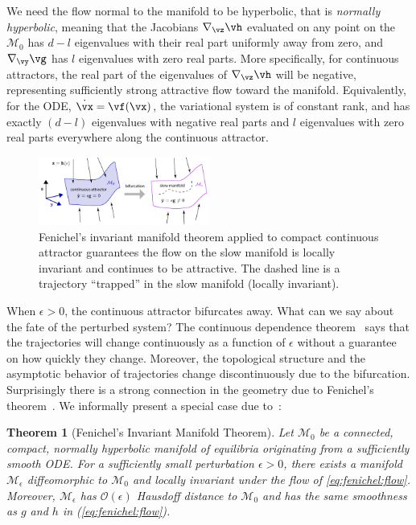 \documentclass{article} %
\newcounter{ct}
\newcommand{\manifold}{\mathcal{M}}
\newtheorem{theorem}{Theorem}
\theoremstyle{definition}
\theoremstyle{remark}
\renewcommand{\cite}{\citep}
\begin{document}
We need the flow normal to the manifold to be hyperbolic, that is \emph{normally hyperbolic}, meaning that the Jacobians $\nabla_\vz \vh$ evaluated on any point on the $\manifold_0$ has $d-l$ eigenvalues with their real part uniformly away from zero, and $\nabla_\vy \vg$ has $l$ eigenvalues with zero real parts.
More specifically, for continuous attractors, the real part of the eigenvalues of $\nabla_\vz \vh$ will be negative, representing sufficiently strong attractive flow toward the manifold.
Equivalently, for the ODE, $\dot{\vx} = \vf(\vx)$, the variational system is of constant rank, and has exactly $(d-l)$ eigenvalues with negative real parts and $l$ eigenvalues with zero real parts everywhere along the continuous attractor.

\begin{figure}[bthp]
  \centering
  \includegraphics[width=0.5\textwidth]{FenichelThm.pdf}
  \caption{
    Fenichel's invariant manifold theorem applied to compact continuous attractor guarantees the flow on the slow manifold is locally invariant and continues to be attractive.
    The dashed line is a trajectory ``trapped'' in the slow manifold (locally invariant).
  }
  \label{fig:fenichel}
\end{figure}

When $\epsilon > 0$, the continuous attractor bifurcates away.
What can we say about the fate of the perturbed system?
The continuous dependence theorem~\citep{Chicone2006} says that the trajectories will change continuously as a function of $\epsilon$ without a guarantee on how quickly they change.
Moreover, the topological structure and the asymptotic behavior of trajectories change discontinuously due to the bifurcation.
Surprisingly there is a strong connection in the geometry due to Fenichel's theorem~\cite{fenichel1971}.
We informally present a special case due to~\cite{Jones1995}:
\begin{theorem}[Fenichel's Invariant Manifold Theorem]
Let $\manifold_0$ be a connected, compact, normally hyperbolic manifold of equilibria originating from a sufficiently smooth ODE.
For a sufficiently small perturbation $\epsilon > 0$, there exists a manifold $\manifold_\epsilon$ diffeomorphic to $\manifold_0$ and locally invariant under the flow of \eqref{eq:fenichel:flow}.
Moreover, $\manifold_\epsilon$ has $\mathcal{O}(\epsilon)$ Hausdoff distance to $\manifold_0$ and has the same smoothness as $g$ and $h$ in (\ref{eq:fenichel:flow}).
\end{theorem}
\end{document}
